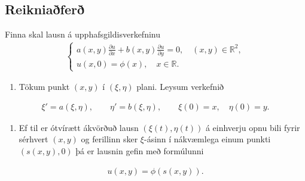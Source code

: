 \documentclass[a4paper,10pt,icelandic]{sphinxmanual}
\begin{document}
\subsection{Reikniaðferð}
\label{\detokenize{Kafli01:reikniafer}}
Finna skal lausn á upphafsgildisverkefninu
\begin{equation*}
\begin{split}\left\{\begin {array}{l}
a(x,y)\frac{\partial u}{\partial x}+ b(x,y)\frac{\partial u}{\partial y} = 0, \quad (x,y)\in \mathbb{R}^2, \\
u(x,0) = \phi(x), \quad x \in \mathbb{R}.
\end{array}\right.\end{split}
\end{equation*}\begin{enumerate}
\def\theenumi{\arabic{enumi}}
\def\labelenumi{\theenumi .}
\makeatletter\def\p@enumii{\p@enumi \theenumi .}\makeatother
\item {} 
Tökum punkt \((x,y)\) í \((\xi,\eta)\) plani. Leysum verkefnið

\end{enumerate}
\begin{equation*}
\begin{split}\xi' = a(\xi,\eta), \qquad \eta' = b(\xi,\eta), \qquad \xi(0) = x, \quad \eta(0) = y.\end{split}
\end{equation*}\begin{enumerate}
\def\theenumi{\arabic{enumi}}
\def\labelenumi{\theenumi .}
\makeatletter\def\p@enumii{\p@enumi \theenumi .}\makeatother
\setcounter{enumi}{1}
\item {} 
Ef til er ótvírætt ákvörðuð lausn \((\xi(t),\eta(t))\) á einhverju opnu bili fyrir sérhvert \((x,y)\) og ferillinn sker \(\xi\)-ásinn í nákvæmlega einum punkti \((s(x,y),0)\) þá er lausnin gefin með formúlunni

\end{enumerate}
\begin{equation*}
\begin{split}u(x,y) = \phi(s(x,y)).\end{split}
\end{equation*}
\end{document}
